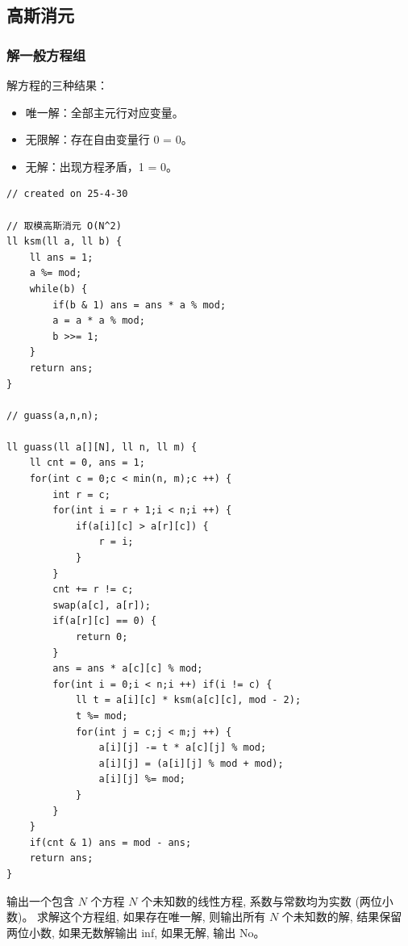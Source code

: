 \documentclass[a4paper,12pt]{article}
\begin{document}
\subsection{高斯消元}

\subsubsection{解一般方程组}

\noindent 解方程的三种结果：

\begin{itemize}
    \item 唯一解：全部主元行对应变量。
    \item 无限解：存在自由变量行 0 = 0。
    \item 无解：出现方程矛盾，1 = 0。
\end{itemize}

\begin{lstlisting}
// created on 25-4-30

// 取模高斯消元 O(N^2)
ll ksm(ll a, ll b) {
    ll ans = 1;
    a %= mod;
    while(b) {
        if(b & 1) ans = ans * a % mod;
        a = a * a % mod;
        b >>= 1;
    }
    return ans;
}

// guass(a,n,n);

ll guass(ll a[][N], ll n, ll m) { 
    ll cnt = 0, ans = 1;
    for(int c = 0;c < min(n, m);c ++) {
        int r = c;
        for(int i = r + 1;i < n;i ++) {
            if(a[i][c] > a[r][c]) {
                r = i;
            }
        }
        cnt += r != c;
        swap(a[c], a[r]);
        if(a[r][c] == 0) {
            return 0;
        }
        ans = ans * a[c][c] % mod;
        for(int i = 0;i < n;i ++) if(i != c) {
            ll t = a[i][c] * ksm(a[c][c], mod - 2);
            t %= mod;
            for(int j = c;j < m;j ++) {
                a[i][j] -= t * a[c][j] % mod;
                a[i][j] = (a[i][j] % mod + mod);
                a[i][j] %= mod;
            }
        }
    }
    if(cnt & 1) ans = mod - ans;
    return ans;
}
\end{lstlisting}

\noindent 输出一个包含 $N$ 个方程 $N$ 个未知数的线性方程, 系数与常数均为实数 (两位小数)。
求解这个方程组, 如果存在唯一解, 则输出所有 $N$ 个未知数的解, 
结果保留两位小数, 如果无数解输出 inf, 如果无解, 输出 No。\\
\end{document}
